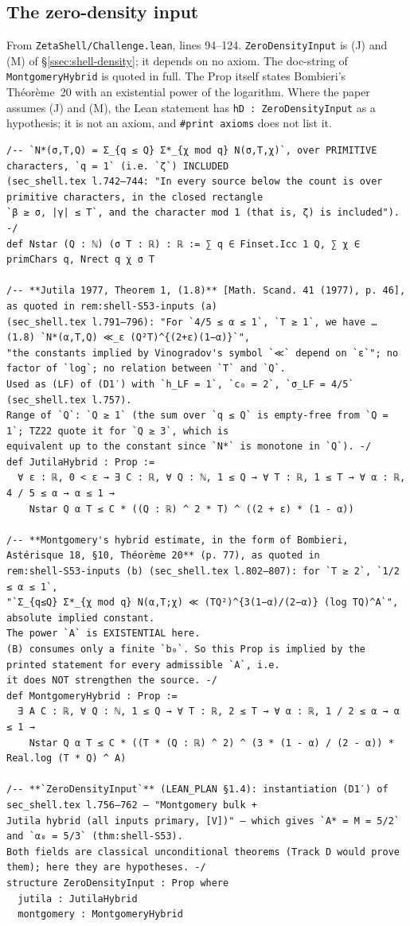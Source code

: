 \subsection{The zero-density input}\label{app:lean-density}
From \texttt{ZetaShell/Challenge.lean}, lines 94--124. \texttt{ZeroDensityInput} is (J) and (M) of \S\ref{ssec:shell-density}; it depends on no axiom. The
doc-string of \texttt{MontgomeryHybrid} is quoted in full.
The Prop itself states Bombieri's Th\'eor\`eme~20 with an existential power of the logarithm. Where the paper assumes (J) and (M), the Lean statement
has \texttt{hD : ZeroDensityInput} as a hypothesis; it is not an axiom, and \texttt{\#print axioms} does not list it.
\begin{Verbatim}[fontsize=\footnotesize,breaklines,frame=single,framesep=2mm]
/-- `N*(σ,T,Q) = Σ_{q ≤ Q} Σ*_{χ mod q} N(σ,T,χ)`, over PRIMITIVE characters, `q = 1` (i.e. `ζ`) INCLUDED
(sec_shell.tex l.742–744: "In every source below the count is over primitive characters, in the closed rectangle
`β ≥ σ, |γ| ≤ T`, and the character mod 1 (that is, ζ) is included"). -/
def Nstar (Q : ℕ) (σ T : ℝ) : ℝ := ∑ q ∈ Finset.Icc 1 Q, ∑ χ ∈ primChars q, Nrect q χ σ T

/-- **Jutila 1977, Theorem 1, (1.8)** [Math. Scand. 41 (1977), p. 46], as quoted in rem:shell-S53-inputs (a)
(sec_shell.tex l.791–796): "For `4/5 ≤ α ≤ 1`, `T ≥ 1`, we have … (1.8) `N*(α,T,Q) ≪_ε (Q²T)^{(2+ε)(1−α)}`",
"the constants implied by Vinogradov's symbol `≪` depend on `ε`"; no factor of `log`; no relation between `T` and `Q`.
Used as (LF) of (D1′) with `h_LF = 1`, `c₀ = 2`, `σ_LF = 4/5` (sec_shell.tex l.757).
Range of `Q`: `Q ≥ 1` (the sum over `q ≤ Q` is empty-free from `Q = 1`; TZ22 quote it for `Q ≥ 3`, which is
equivalent up to the constant since `N*` is monotone in `Q`). -/
def JutilaHybrid : Prop :=
  ∀ ε : ℝ, 0 < ε → ∃ C : ℝ, ∀ Q : ℕ, 1 ≤ Q → ∀ T : ℝ, 1 ≤ T → ∀ α : ℝ, 4 / 5 ≤ α → α ≤ 1 →
    Nstar Q α T ≤ C * ((Q : ℝ) ^ 2 * T) ^ ((2 + ε) * (1 - α))

/-- **Montgomery's hybrid estimate, in the form of Bombieri, Astérisque 18, §10, Théorème 20** (p. 77), as quoted in
rem:shell-S53-inputs (b) (sec_shell.tex l.802–807): for `T ≥ 2`, `1/2 ≤ α ≤ 1`,
"`Σ_{q≤Q} Σ*_{χ mod q} N(α,T;χ) ≪ (TQ²)^{3(1−α)/(2−α)} (log TQ)^A`", absolute implied constant.
The power `A` is EXISTENTIAL here.
(B) consumes only a finite `b₀`. So this Prop is implied by the printed statement for every admissible `A`, i.e.
it does NOT strengthen the source. -/
def MontgomeryHybrid : Prop :=
  ∃ A C : ℝ, ∀ Q : ℕ, 1 ≤ Q → ∀ T : ℝ, 2 ≤ T → ∀ α : ℝ, 1 / 2 ≤ α → α ≤ 1 →
    Nstar Q α T ≤ C * ((T * (Q : ℝ) ^ 2) ^ (3 * (1 - α) / (2 - α)) * Real.log (T * Q) ^ A)

/-- **`ZeroDensityInput`** (LEAN_PLAN §1.4): instantiation (D1′) of sec_shell.tex l.756–762 — "Montgomery bulk +
Jutila hybrid (all inputs primary, [V])" — which gives `A* = M = 5/2` and `α₀ = 5/3` (thm:shell-S53).
Both fields are classical unconditional theorems (Track D would prove them); here they are hypotheses. -/
structure ZeroDensityInput : Prop where
  jutila : JutilaHybrid
  montgomery : MontgomeryHybrid
\end{Verbatim}

